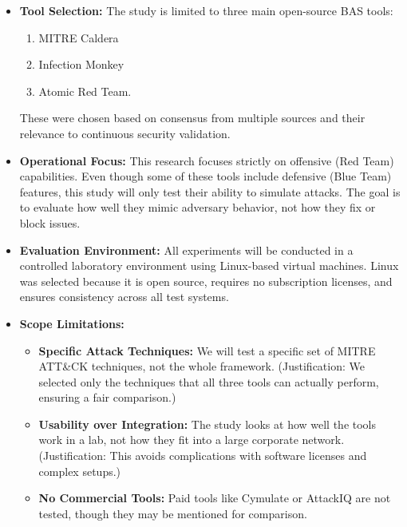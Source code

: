 \begin{itemize}
    \item \textbf{Tool Selection:} The study is limited to three main open-source BAS tools:
    \begin{enumerate}
        \item MITRE Caldera
        \item Infection Monkey
        \item Atomic Red Team.
    \end{enumerate}
    
    These were chosen based on consensus from multiple sources and their relevance to continuous security validation.

    \item \textbf{Operational Focus:} This research focuses strictly on offensive (Red Team) capabilities. Even though some of these tools include defensive (Blue Team) features, this study will only test their ability to simulate attacks. The goal is to evaluate how well they mimic adversary behavior, not how they fix or block issues.

    \item \textbf{Evaluation Environment:} All experiments will be conducted in a controlled laboratory environment using Linux-based virtual machines. Linux was selected because it is open source, requires no subscription licenses, and ensures consistency across all test systems.

    \item \textbf{Scope Limitations:}
    \begin{itemize}
        \item \textbf{Specific Attack Techniques:} We will test a specific set of MITRE ATT\&CK techniques, not the whole framework. (Justification: We selected only the techniques that all three tools can actually perform, ensuring a fair comparison.)

        \item \textbf{Usability over Integration:} The study looks at how well the tools work in a lab, not how they fit into a large corporate network. (Justification: This avoids complications with software licenses and complex setups.)

        \item \textbf{No Commercial Tools:} Paid tools like Cymulate or AttackIQ are not tested, though they may be mentioned for comparison.
    \end{itemize}
\end{itemize}

